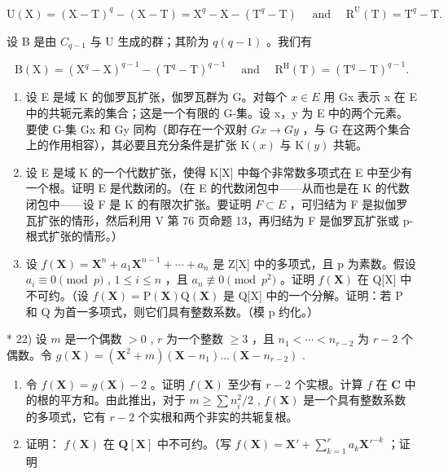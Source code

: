 \[
\mathrm{U} (\mathrm{X}) = (\mathrm{X} - \mathrm{T}) ^ {q} - (\mathrm{X} - \mathrm{T}) = \mathrm{X} ^ {q} - \mathrm{X} - (\mathrm{T} ^ {q} - \mathrm{T}) \quad \text { and } \quad \mathrm{R} ^ {\mathrm{U}} (\mathrm{T}) = \mathrm{T} ^ {q} - \mathrm{T}.
\]

设 B 是由 \(C_{q-1}\) 与 U 生成的群；其阶为 \(q(q-1)\) 。我们有

\[
\mathrm{B} (\mathrm{X}) = \left(\mathrm{X} ^ {q} - \mathrm{X}\right) ^ {q - 1} - \left(\mathrm{T} ^ {q} - \mathrm{T}\right) ^ {q - 1} \quad \text { and } \quad \mathrm{R} ^ {\mathrm{H}} (\mathrm{T}) = \left(\mathrm{T} ^ {q} - \mathrm{T}\right) ^ {q - 1}.
\]

\begin{enumerate}
\def\labelenumi{\arabic{enumi})}
\setcounter{enumi}{18}
\item
  设 E 是域 K 的伽罗瓦扩张，伽罗瓦群为 G。对每个 \(x \in E\) 用 Gx 表示 x 在 E 中的共轭元素的集合；这是一个有限的 G-集。设 x，y 为 E 中的两个元素。要使 G-集 Gx 和 Gy 同构（即存在一个双射 \(Gx \rightarrow Gy\) ，与 G 在这两个集合上的作用相容），其必要且充分条件是扩张 \(\mathrm{K}(x)\) 与 \(\mathrm{K}(y)\) 共轭。
\item
  设 E 是域 K 的一个代数扩张，使得 K{[}X{]} 中每个非常数多项式在 E 中至少有一个根。证明 E 是代数闭的。（在 E 的代数闭包中——从而也是在 K 的代数闭包中——设 F 是 K 的有限次扩张。要证明 \(F \subset E\) ，可归结为 F 是拟伽罗瓦扩张的情形，然后利用 V 第 76 页命题 13，再归结为 F 是伽罗瓦扩张或 p-根式扩张的情形。）
\item
  设 \(f(\mathbf{X}) = \mathbf{X}^{n} + a_{1}\mathbf{X}^{n-1} + \cdots + a_{n}\) 是 Z{[}X{]} 中的多项式，且 p 为素数。假设 \(a_{i} \equiv 0 \pmod{p}\) , \(1 \leqslant i \leqslant n\) ，且 \(a_{n} \not\equiv 0 \pmod{p^{2}}\) 。证明 \(f(\mathbf{X})\) 在 Q{[}X{]} 中不可约。（设 \(f(\mathbf{X}) = \mathrm{P}(\mathbf{X}) \mathrm{Q}(\mathbf{X})\) 是 Q{[}X{]} 中的一个分解。证明：若 P 和 Q 为首一多项式，则它们具有整数系数。（模 p 约化。）
\end{enumerate}

* 22) 设 \(m\) 是一个偶数 \(>0\) , \(r\) 为一个整数 \(\geqslant 3\) ，且 \(n_1 < \cdots < n_{r-2}\) 为 \(r-2\) 个偶数。令 \(g(\mathbf{X}) = (\mathbf{X}^2 + m)(\mathbf{X} - n_1) \ldots (\mathbf{X} - n_{r-2})\) .

\begin{enumerate}
\def\labelenumi{\alph{enumi})}
\item
  令 \(f(\mathbf{X}) = g(\mathbf{X}) - 2\) 。证明 \(f(\mathbf{X})\) 至少有 \(r - 2\) 个实根。计算 \(f\) 在 \(\mathbf{C}\) 中的根的平方和。由此推出，对于 \(m \geqslant \sum n_i^2 / 2\) , \(f(\mathbf{X})\) 是一个具有整数系数的多项式，它有 \(r - 2\) 个实根和两个非实的共轭复根。
\item
  证明： \(f(\mathbf{X})\) 在 \(\mathbf{Q}[\mathbf{X}]\) 中不可约。（写 \(f(\mathbf{X}) = \mathbf{X}' + \sum_{k=1}^{r} a_k \mathbf{X}'^{-k}\) ；证明
\end{enumerate}

